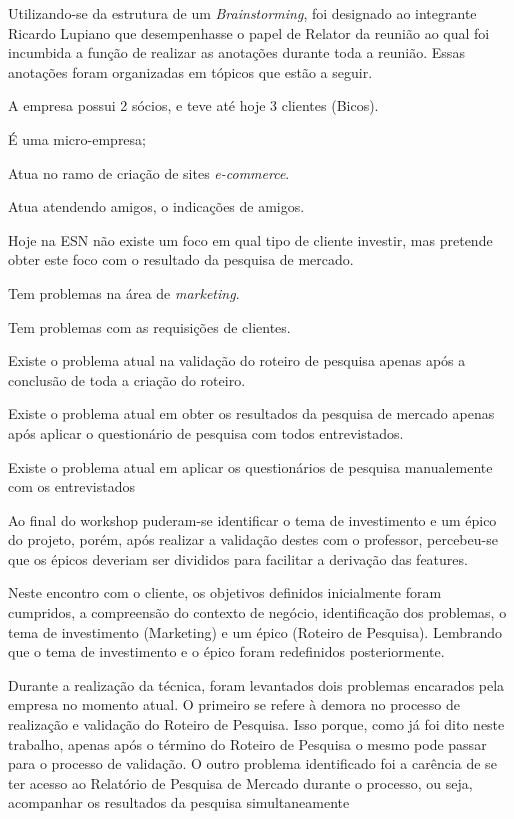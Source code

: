 		Utilizando-se da estrutura de um \textit{Brainstorming}, foi designado ao integrante Ricardo Lupiano que desempenhasse o papel de Relator da reunião ao qual foi incumbida a função de realizar as anotações durante toda a reunião. Essas anotações foram organizadas em tópicos que estão a seguir.

		\begin{itemize}
		{
			\item A empresa possui 2 sócios, e teve até hoje 3 clientes (Bicos).
			\item É uma micro-empresa;
			\item Atua no ramo de criação de sites \textit{e-commerce}.
			\item Atua atendendo amigos, o indicações de amigos.
			\item Hoje na ESN não existe um foco em qual tipo de cliente investir, mas pretende obter este foco com o resultado da pesquisa de mercado.
			\item Tem problemas na área de \textit{marketing}.
			\item Tem problemas com as requisições de clientes.
			\item Existe o problema atual na validação do roteiro de pesquisa apenas após a conclusão de toda a criação do roteiro.
			\item Existe o problema atual em obter os resultados da pesquisa de mercado apenas após aplicar o questionário de pesquisa com todos entrevistados.
			\item Existe o problema atual em aplicar os questionários de pesquisa manualemente com os entrevistados
		}
		\end{itemize}

		Ao final do workshop puderam-se identificar o tema de investimento e um épico do projeto, porém, após realizar a validação destes com o professor, percebeu-se que os épicos deveriam ser divididos para facilitar a derivação das features.
		
		Neste encontro com o cliente, os objetivos definidos inicialmente foram cumpridos, a compreensão do contexto de negócio, identificação dos problemas, o tema de investimento (Marketing) e um épico (Roteiro de Pesquisa). Lembrando que o tema de investimento e o épico foram redefinidos posteriormente.
		
		Durante a realização da técnica, foram levantados dois problemas encarados pela empresa no momento atual. O primeiro se refere à demora no processo de realização e validação do Roteiro de Pesquisa. Isso porque, como já foi dito neste trabalho, apenas após o término do Roteiro de Pesquisa o mesmo pode passar para o processo de validação. O outro problema identificado foi a carência de se ter acesso ao Relatório de Pesquisa de Mercado durante o processo, ou seja, acompanhar os resultados da pesquisa simultaneamente

